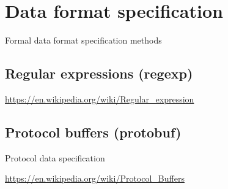 
\section{Data format specification}

Formal data format specification methods

\subsection{Regular expressions (regexp)}


\url{https://en.wikipedia.org/wiki/Regular_expression}


\subsection{Protocol buffers (protobuf)}

Protocol data specification

\url{https://en.wikipedia.org/wiki/Protocol_Buffers}
